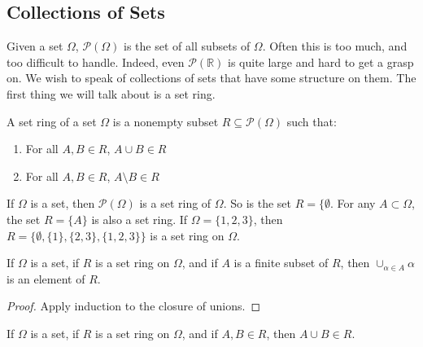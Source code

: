 \documentclass[crop=false,class=book,oneside]{standalone}
\begin{document}
        \subsection{Collections of Sets}
            Given a set $\Omega$, $\mathcal{P}(\Omega)$ is the
            set of all subsets of $\Omega$. Often this is too
            much, and too difficult to handle. Indeed, even
            $\mathcal{P}(\mathbb{R})$ is quite large and hard
            to get a grasp on. We wish to speak of collections
            of sets that have some structure on them.
            The first thing we will talk about is a set ring.
            \begin{definition}
                A set ring of a set $\Omega$ is a nonempty
                subset $R\subseteq\mathcal{P}(\Omega)$ such that:
                \begin{enumerate}
                    \item For all $A,B\in{R}$, $A\cup{B}\in{R}$
                    \item For all $A,B\in{R}$,
                          $A\setminus{B}\in{R}$
                \end{enumerate}
            \end{definition}
            \begin{example}
                If $\Omega$ is a set, then
                $\mathcal{P}(\Omega)$ is a set ring of
                $\Omega$. So is the set $R=\{\emptyset$.
                For any $A\subset\Omega$, the set
                $R=\{A\}$ is also a set ring. If
                $\Omega=\{1,2,3\}$, then
                $R=\{\emptyset,\{1\},\{2,3\},\{1,2,3\}\}$ is
                a set ring on $\Omega$.
            \end{example}
            \begin{theorem}
                If $\Omega$ is a set, if $R$ is a set ring
                on $\Omega$, and if $A$ is a finite subset of
                $R$, then $\cup_{\alpha\in{A}}\alpha$ is an
                element of $R$.
            \end{theorem}
            \begin{proof}
                Apply induction to the closure of unions.
            \end{proof}
            \begin{theorem}
                If $\Omega$ is a set, if $R$ is a set ring on
                $\Omega$, and if $A,B\in{R}$, then
                $A\cup{B}\in{R}$.
            \end{theorem}
\end{document}
